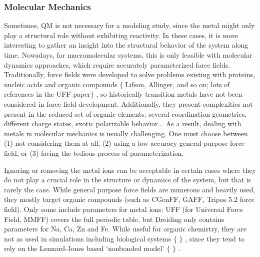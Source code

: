 \subsubsection{Molecular Mechanics}
Sometimes, QM is not necessary for a modeling study, since the metal might only play a structural role without exhibiting reactivity. In these cases, it is more interesting to gather an insight into the structural behavior of the system along time. Nowadays, for macromolecular systems, this is only feasible with molecular dynamics approaches, which require accurately parameterized force fields. Traditionally, force fields were developed to solve problems existing with proteins, nucleic acids and organic compounds $ \{ $ Lifson, Allinger, and so on; lots of references in the UFF paper$ \} $ , so historically transition metals have not been considered in force field development. Additionally, they present complexities not present in the reduced set of organic elements: several coordination geometries, different charge states, exotic polarizable behavior... As a result, dealing with metals in molecular mechanics is usually challenging. One must choose between (1) not considering them at all, (2) using a low-accuracy general-purpose force field, or (3) facing the tedious process of parameterization.

Ignoring or removing the metal ions can be acceptable in certain cases where they do not play a crucial role in the structure or dynamics of the system, but that is rarely the case. While general purpose force fields are numerous and heavily used, they mostly target organic compounds (such as CGenFF,\cite{Vanommeslaeghe2009} GAFF,\cite{Wang2004} Tripos 5.2 force field\cite{clark1989}). Only some include parameters for metal ions: UFF (for Universal Force Field,\cite{rappe1992} MMFF\cite{halgren1996}) covers the full periodic table, but Dreiding\cite{Mayo1990} only contains parameters for Na, Ca, Zn and Fe. While useful for organic chemistry, they are not as used in simulations including biological systems $ \{ $ $ \} $ , since they tend to rely on the Lennard-Jones based ‘nonbonded model’ $ \{ $ $ \} $ .


